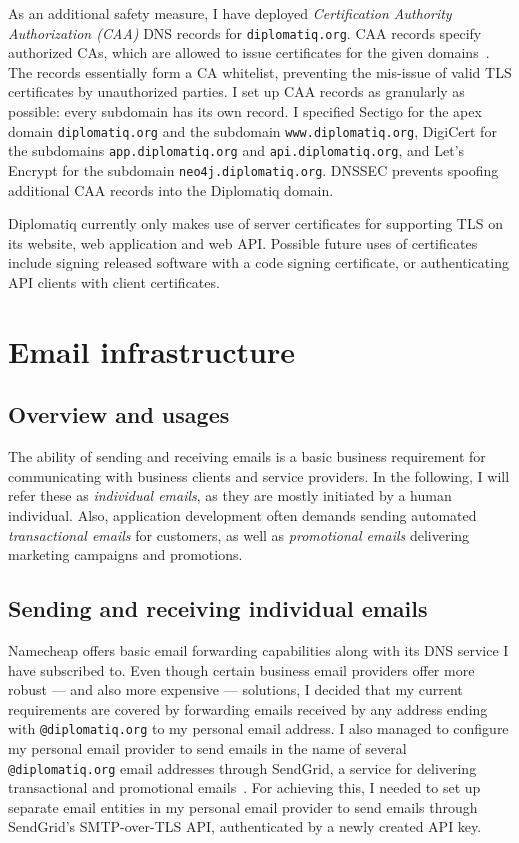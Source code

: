 As an additional safety measure, I have deployed \emph{Certification Authority Authorization (CAA)} DNS records for \lstinline{diplomatiq.org}. CAA records specify authorized CAs, which are allowed to issue certificates for the given domains~\cite{rfc8659}. The records essentially form a CA whitelist, preventing the mis-issue of valid TLS certificates by unauthorized parties. I set up CAA records as granularly as possible: every subdomain has its own record. I specified Sectigo for the apex domain \lstinline{diplomatiq.org} and the subdomain \lstinline{www.diplomatiq.org}, DigiCert for the subdomains \lstinline{app.diplomatiq.org} and \lstinline{api.diplomatiq.org}, and Let's Encrypt for the subdomain \lstinline{neo4j.diplomatiq.org}. DNSSEC prevents spoofing additional CAA records into the Diplomatiq domain.

Diplomatiq currently only makes use of server certificates for supporting TLS on its website, web application and web API. Possible future uses of certificates include signing released software with a code signing certificate, or authenticating API clients with client certificates.

\section{Email infrastructure}

\subsection{Overview and usages}

The ability of sending and receiving emails is a basic business requirement for communicating with business clients and service providers. In the following, I will refer these as \emph{individual emails}, as they are mostly initiated by a human individual. Also, application development often demands sending automated \emph{transactional emails} for customers, as well as \emph{promotional emails} delivering marketing campaigns and promotions.

\subsection{Sending and receiving individual emails}

Namecheap offers basic email forwarding capabilities along with its DNS service I have subscribed to. Even though certain business email providers offer more robust — and also more expensive — solutions, I decided that my current requirements are covered by forwarding emails received by any address ending with \lstinline{@diplomatiq.org} to my personal email address. I also managed to configure my personal email provider to send emails in the name of several \lstinline{@diplomatiq.org} email addresses through SendGrid, a service for delivering transactional and promotional emails~\cite{sendgrid-website}. For achieving this, I needed to set up separate email entities in my personal email provider to send emails through SendGrid's SMTP-over-TLS API, authenticated by a newly created API key.

